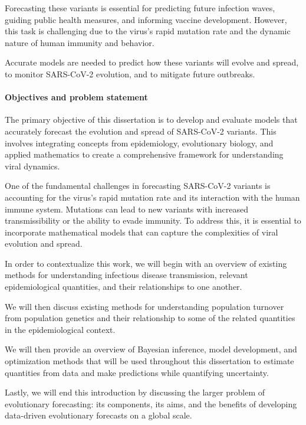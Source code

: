 Forecasting these variants is essential for predicting future infection waves, guiding public health measures, and informing vaccine development.
However, this task is challenging due to the virus's rapid mutation rate and the dynamic nature of human immunity and behavior. 

Accurate models are needed to predict how these variants will evolve and spread, to monitor SARS-CoV-2 evolution, and to mitigate future outbreaks.


\paragraph{Objectives and problem statement}

The primary objective of this dissertation is to develop and evaluate models that accurately forecast the evolution and spread of SARS-CoV-2 variants. This involves integrating concepts from epidemiology, evolutionary biology, and applied mathematics to create a comprehensive framework for understanding viral dynamics.

One of the fundamental challenges in forecasting SARS-CoV-2 variants is accounting for the virus's rapid mutation rate and its interaction with the human immune system. Mutations can lead to new variants with increased transmissibility or the ability to evade immunity. To address this, it is essential to incorporate mathematical models that can capture the complexities of viral evolution and spread.

In order to contextualize this work, we will begin with an overview of existing methods for understanding infectious disease transmission, relevant epidemiological quantities, and their relationships to one another.

We will then discuss existing methods for understanding population turnover from population genetics and their relationship to some of the related quantities in the epidemiological context.

We will then provide an overview of Bayesian inference, model development, and optimization methods that will be used throughout this dissertation to estimate quantities from data and make predictions while quantifying uncertainty.

Lastly, we will end this introduction by discussing the larger problem of evolutionary forecasting: its components, its aims, and the benefits of developing data-driven evolutionary forecasts on a global scale.

